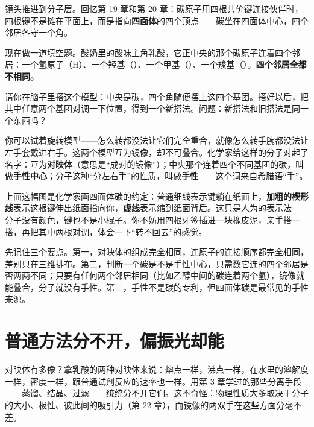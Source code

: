 镜头推进到分子层。回忆第 19 章和第 20 章：碳原子用四根共价键连接伙伴时，四根键不是摊在平面上，而是指向\textbf{四面体}的四个顶点——碳坐在四面体中心，四个邻居各守一个角。

现在做一道填空题。酸奶里的酸味主角乳酸，它正中央的那个碳原子连着四个邻居：一个氢原子（H）、一个羟基（）、一个甲基（）、一个羧基（）。\textbf{四个邻居全都不相同。}

请你在脑子里搭这个模型：中央是碳，四个角随便摆上这四个基团。搭好以后，把其中任意两个基团对调一下位置，得到一个新搭法。问题：新搭法和旧搭法是同一个东西吗？

你可以试着旋转模型——怎么转都没法让它们完全重合，就像怎么转手腕都没法让左手套戴进右手。这两个模型互为镜像，却不可叠合。化学家给这样的分子对起了名字：互为\textbf{对映体}（意思是“成对的镜像”）；中央那个连着四个不同基团的碳，叫做\textbf{手性中心}；分子这种“分左右手”的性质，叫做\textbf{手性}——这个词来自希腊语“手”。


上面这幅图是化学家画四面体碳的约定：普通细线表示键躺在纸面上，\textbf{加粗的楔形线}表示这根键伸出纸面指向你，\textbf{虚线}表示缩到纸面背后。这只是人为的表示法——分子没有颜色，键也不是小棍子。你不妨用四根牙签插进一块橡皮泥，亲手搭一搭，再把其中两根对调，体会一下“转不回去”的感觉。

先记住三个要点。第一，对映体的组成完全相同，连原子的连接顺序都完全相同，差别只在三维排布。第二，判断一个碳是不是手性中心，只需数它连的四个邻居是否两两不同；只要有任何两个邻居相同（比如乙醇中间的碳连着两个氢），镜像就能叠合，分子就没有手性。第三，手性不是碳的专利，但四面体碳是最常见的手性来源。

\section{普通方法分不开，偏振光却能}

对映体有多像？拿乳酸的两种对映体来说：熔点一样，沸点一样，在水里的溶解度一样，密度一样，跟普通试剂反应的速率也一样。用第 3 章学过的那些分离手段——蒸馏、结晶、过滤——统统分不开它们。这不奇怪：物理性质大多取决于分子的大小、极性、彼此间的吸引力（第 22 章），而镜像的两双手在这些方面分毫不差。


